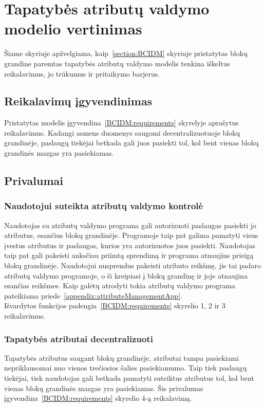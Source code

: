\section{Tapatybės atributų valdymo modelio vertinimas}

Šiame skyriuje apžvelgiama, kaip~\ref{section:BCIDM} skyriuje pristatytas blokų grandine paremtas tapatybės atributų
valdymo modelis tenkina iškeltus reikalavimus, jo trūkumus ir pritaikymo barjerus.

\subsection{Reikalavimų įgyvendinimas}

Pristatytas modelis įgyvendina~\ref{BCIDM:requirements} skyrelyje aprašytus reikalavimus.
Kadangi asmens duomenys
saugomi decentralizuotuoje blokų grandinėje, paslaugų tiekėjai betkada gali juos pasiekti tol, kol bent vienas blokų grandinės
mazgas yra pasiekiamas.

\subsection{Privalumai}

\subsubsection{Naudotojui suteikta atributų valdymo kontrolė}

Naudotojas su atributų valdymo programa gali autorizuoti paslaugas pasiekti jo atributus, esančius blokų grandinėje. Programoje
taip pat galima pamatyti visus įvestus atributus ir paslaugas, kurios yra autorizuotos juos pasiekti. Naudotojas taip pat
gali pakeisti anksčiau priimtą sprendimą ir programa atnaujins prieigą blokų grandinėje. Naudotojui nusprendus pakeisti
atributo reikšmę, jis tai padaro atributų valdymo programoje, o ši kreipiasi į blokų grandinę ir joje atnaujina esančias reikšmes. Kaip
galėtų atrodyti tokia atributų valdymo programa pateikiama priede~\ref{appendix:attributeManagementApp}.\\
Išvardytos funkcijos padengia~\ref{BCIDM:requirements} skyrelio 1, 2 ir 3 reikalavimus.

\subsubsection{Tapatybės atributai decentralizuoti}

Tapatybės atributus saugant blokų grandinėje, atributai tampa pasiekiami nepriklausomai nuo vienos trečiosios šalies pasiekiamumo.
Taip tiek paslaugų tiekėjai, tiek naudotojas gali betkada pamatyti suteiktus atributus tol, kol bent vienas blokų grandinės mazgas
yra pasiekiamas.
Šis privalumas įgyvendina~\ref{BCIDM:requirements} skyrelio 4-ą reikalavimą.

